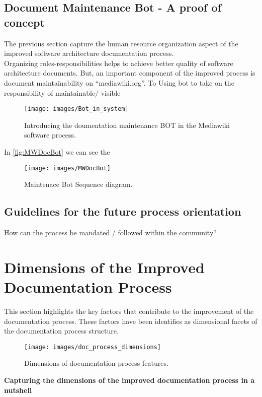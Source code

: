\subsection{Document Maintenance Bot - A proof of concept}
\indent The previous section capture the human resource organization aspect of the improved software architecture documentation process.
\\\indent Organizing roles-responsibilities helps to achieve better quality of software architecture documents. But, an important component of the improved process is document maintainability on \enquote{mediawiki.org}. To  
Using bot to take on the responsibility of maintainable/ visible

\begin{figure}[H]
  \centering
  \texttt{[image: images/Bot\_in\_system]}
  \caption[Introducing the doumentation maintenance BOT in the Mediawiki software process]{Introducing the doumentation maintenance BOT in the Mediawiki software process.}\label{fig:/Bot_in_system}
\end{figure}

In \autoref{fig:MWDocBot}  we can see the 
\begin{figure}[H]
  \centering
  \texttt{[image: images/MWDocBot]}
  \caption[Maintenace Bot Sequence diagram]{Maintenace Bot Sequence diagram.}\label{fig:MWDocBot}
\end{figure}
\subsection{Guidelines for the future process orientation}
How can the process be mandated / followed within the community?


\section{Dimensions of the Improved Documentation Process} \label{PorcDimension}
\indent This section highlights the key factors that contribute to the improvement of the documentation process. These factors have been identifies as dimensional facets of the documentation process structure. 
\begin{figure}[H]
  \centering
  \texttt{[image: images/doc\_process\_dimensions]}
  \caption[Dimensions of documentation process features]{Dimensions of documentation process features.}\label{fig:doc_process_dimensions}
\end{figure}
\textbf{Capturing the dimensions of the improved documentation process in a nutshell} 


